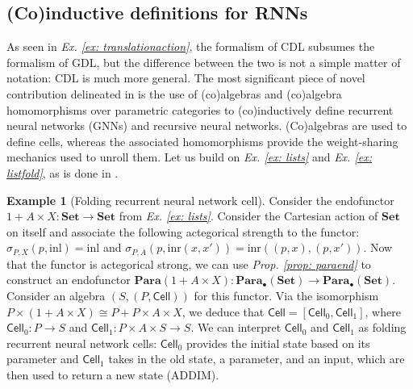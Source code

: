 \documentclass[11pt,a4paper,openright,twoside]{report}
\theoremstyle{plain}
\theoremstyle{definition}
\newtheorem{example}[proposition]{Example}
\begin{document}
\subsection{(Co)inductive definitions for RNNs}

As seen in \textit{Ex. \ref{ex: translationaction}}, the formalism of CDL subsumes the formalism of GDL, but the difference between the two is not a simple matter of notation: CDL is much more general. The most significant piece of novel contribution delineated in \cite{gavranovicposition} is the use of (co)algebras and (co)algebra homomorphisms over parametric categories to (co)inductively define recurrent neural networks (GNNs) and recursive neural networks. (Co)algebras are used to define cells, whereas the associated homomorphisms provide the weight-sharing mechanics used to unroll them. Let us build on \textit{Ex. \ref{ex: lists}} and \textit{Ex. \ref{ex: listfold}}, as is done in \cite{gavranovicposition}.

\begin{example}[Folding recurrent neural network cell]
  \label{ex: frnncell}
  Consider the endofunctor $1 + A \times X: \mathbf{Set} \to \mathbf{Set}$ from \textit{Ex. \ref{ex: lists}}. Consider the Cartesian action of $\mathbf{Set}$ on itself and associate the following actegorical strength to the functor: $\sigma_{P,X}(p,\mathrm{inl}) = \mathrm{inl}$ and  $\sigma_{P,A}(p,\mathrm{inr}(x,x')) = \mathrm{inr}((p,x), (p,x'))$. Now that the functor is actegorical strong, we can use \textit{Prop. \ref{prop: paraend}} to construct an endofunctor $\mathbf{Para}(1 + A \times X): \mathbf{Para}_{\bullet}(\mathbf{Set}) \to \mathbf{Para}_{\bullet}(\mathbf{Set})$. Consider an algebra $(S,(P,\mathsf{Cell}))$ for this functor. Via the isomorphism $P \times (1 + A \times X) \cong P + P \times A \times X$, we deduce that $\mathsf{Cell} = [\mathsf{Cell}_0, \mathsf{Cell}_1]$, where $\mathsf{Cell}_0: P \to S$ and  $\mathsf{Cell}_1: P \times A \times S \to S$. We can interpret $\mathsf{Cell}_0$ and $\mathsf{Cell}_1$ as folding recurrent neural network cells: $\mathsf{Cell}_0$ provides the initial state based on its parameter and $\mathsf{Cell}_1$ takes in the old state, a parameter, and an input, which are then used to return a new state (ADDIM).
\end{example}
\end{document}
